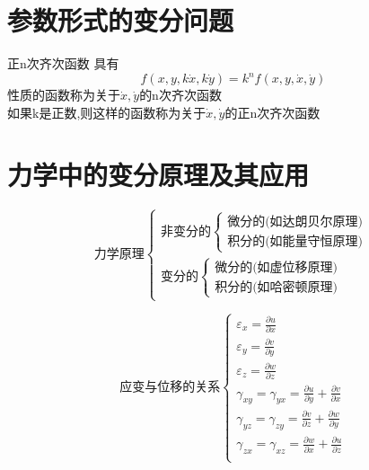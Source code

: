 \documentclass{article}
\begin{document}
\section{参数形式的变分问题}
正n次齐次函数
具有
$$
f(x,y,k\dot{x},k\dot{y})=k^nf(x,y,\dot{x},\dot{y})
$$
性质的函数称为关于$\dot{x},\dot{y}$的n次齐次函数\\
如果k是正数,则这样的函数称为关于$\dot{x},\dot{y}$的正n次齐次函数

\section{力学中的变分原理及其应用}
$$
\text{力学原理}
\left\{
	\begin{array}{ll}
	 \text{非变分的}
	 	\left\{
			\begin{array}{ll}
                    \text{微分的(如达朗贝尔原理)}\\
                    \text{积分的(如能量守恒原理)}
			\end{array}
			\right.  \\
	 \text{变分的}
	 	\left\{
			\begin{array}{ll}
                    \text{微分的(如虚位移原理)}\\
                    \text{积分的(如哈密顿原理)}
			\end{array}
			\right.
	\end{array}
	\right.
$$

\begin{equation}
\text{应变与位移的关系}
\left\{
	\begin{array}{ll}
	\varepsilon_x = \frac{\partial u}{\partial x} \\
	\varepsilon_y = \frac{\partial v}{\partial y} \\
	\varepsilon_z = \frac{\partial w}{\partial z} \\
    \gamma_{xy} = \gamma_{yx} = \frac{\partial u}{\partial y}+ \frac{\partial v}{\partial x}\\
    \gamma_{yz} = \gamma_{zy} = \frac{\partial v}{\partial z}+ \frac{\partial w}{\partial y}\\
    \gamma_{zx} = \gamma_{xz} = \frac{\partial w}{\partial x}+ \frac{\partial u}{\partial z}\\
	\end{array}
	\right.
\label{equation.cauchy}
\end{equation}
\end{document}
